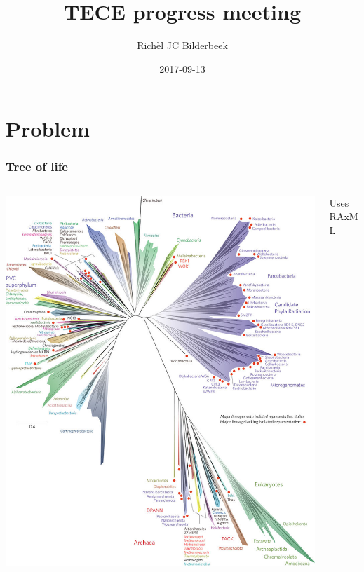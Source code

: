 \documentclass{beamer}
\title[TECE progress meeting]{TECE progress meeting}
\author[RJC Bilderbeek]{Rich\`{e}l JC Bilderbeek}
\institute[University of Groningen]{University of Groningen}
\date[2017-09-13]{2017-09-13}
\begin{document}
\frame{\titlepage}

\section[Problem]{Problem}

\begin{frame}
  \frametitle[]{Tree of life\footnotemark}
  \begin{columns}[T]
    \begin{column}{.45\textwidth}
      \begin{block}{}
        \includegraphics[height=0.65\textheight]{tree_of_life_2016.jpg}
      \end{block}
    \end{column}
    \begin{column}{.5\textwidth}
      \begin{block}{}
        Uses RAxML\footnotemark
      \end{block}
    \end{column}
  \end{columns}
\end{frame}
\end{document}
